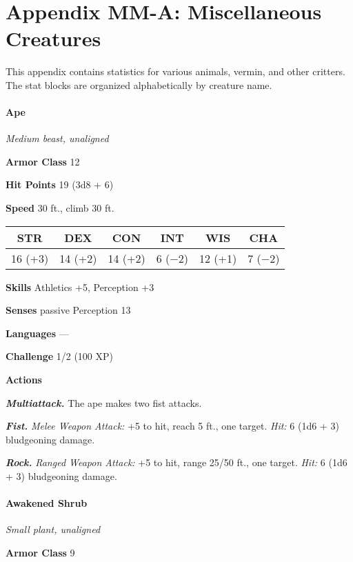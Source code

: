 \documentclass[
]{article}
\date{}
\begin{document}
\hypertarget{appendix-mm-a-miscellaneous-creatures}{%
\section{Appendix MM-A: Miscellaneous
Creatures}\label{appendix-mm-a-miscellaneous-creatures}}

This appendix contains statistics for various animals, vermin, and other
critters. The stat blocks are organized alphabetically by creature name.

\hypertarget{ape}{%
\paragraph{Ape}\label{ape}}

\emph{Medium beast, unaligned}

\textbf{Armor Class} 12

\textbf{Hit Points} 19 (3d8 + 6)

\textbf{Speed} 30 ft., climb 30 ft.

\begin{longtable}[]{@{}cccccc@{}}
\toprule
STR & DEX & CON & INT & WIS & CHA\tabularnewline
\midrule
\endhead
16 (+3) & 14 (+2) & 14 (+2) & 6 (−2) & 12 (+1) & 7 (−2)\tabularnewline
\bottomrule
\end{longtable}

\textbf{Skills} Athletics +5, Perception +3

\textbf{Senses} passive Perception 13

\textbf{Languages} ---

\textbf{Challenge} 1/2 (100 XP)

\textbf{Actions}

\emph{\textbf{Multiattack.}} The ape makes two fist attacks.

\emph{\textbf{Fist.}} \emph{Melee Weapon Attack:} +5 to hit, reach 5
ft., one target. \emph{Hit:} 6 (1d6 + 3) bludgeoning damage.

\emph{\textbf{Rock.}} \emph{Ranged Weapon Attack:} +5 to hit, range
25/50 ft., one target. \emph{Hit:} 6 (1d6 + 3) bludgeoning damage.

\hypertarget{awakened-shrub}{%
\paragraph{Awakened Shrub}\label{awakened-shrub}}

\emph{Small plant, unaligned}

\textbf{Armor Class} 9
\end{document}
